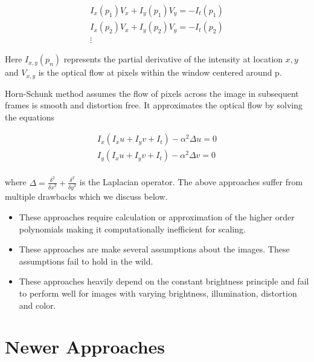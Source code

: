 \documentclass[sigconf]{acmart}
\begin{document}
\begin{equation} \label{eq7}
\begin{split}
I_x (p_1) V_x + I_y (p_1) V_y = - I_t (p_1) \\
I_x (p_2) V_x + I_y (p_2) V_y = - I_t (p_2) \\
\vdots
\end{split}
\end{equation}

Here $I_{x,y}(p_n)$ represents the partial derivative of the intensity at location $x,y$ and $V_{x,y}$ is the optical flow at pixels within the window centered around p. 

Horn-Schunk \cite{Horn:1980:DOF:888857} method assumes the flow of pixels across the image in subsequent frames is smooth and distortion free. It approximates the optical flow by solving the equations 

\begin{equation} \label{eq8}
\begin{split}
I_x(I_x u + I_y v + I_t) - \alpha^2 \Delta u = 0 \\
I_y(I_x u + I_y v + I_t) - \alpha^2 \Delta v = 0 \\
\end{split}
\end{equation}

where $\Delta = \frac{\delta^2}{{\delta x}^2} + \frac{\delta^2}{{\delta y}^2}$ is the Laplacian operator. The above approaches suffer from multiple drawbacks which we discuss below. 

\begin{itemize}
\setlength\itemsep{1em}
\item These approaches require calculation or approximation of the higher order polynomials making it computationally inefficient for scaling.

\item These approaches are make several assumptions about the images. These assumptions fail to hold in the wild.

\item These approaches heavily depend on the constant brightness principle and fail to perform well for images with varying brightness, illumination, distortion and color.

\end{itemize}

\section{Newer Approaches} \label{newer}
\end{document}
